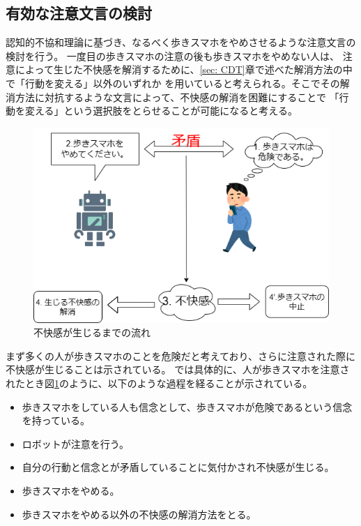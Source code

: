 \documentclass{kuisthesis}
\begin{document}
\subsection{有効な注意文言の検討}
認知的不協和理論に基づき、なるべく歩きスマホをやめさせるような注意文言の検討を行う。
一度目の歩きスマホの注意の後も歩きスマホをやめない人は、
注意によって生じた不快感を解消するために、\ref{sec: CDT}章で述べた解消方法の中で「行動を変える」以外のいずれか
を用いていると考えられる。そこでその解消方法に対抗するような文言によって、不快感の解消を困難にすることで
「行動を変える」という選択肢をとらせることが可能になると考える。
\label{sec: dissonance}
\begin{figure}[htbp]
  
  \includegraphics[width=13cm]{img/CDT.png}
  \caption{不快感が生じるまでの流れ}
  \label{fig: dissonance}
\end{figure}
まず多くの人が歩きスマホのことを危険だと考えており、さらに注意された際に不快感が生じることは示されている。
\cite{Schneider2022}では具体的に、人が歩きスマホを注意されたとき図\ref{fig: dissonance}のように、以下のような過程を経ることが示されている。
\begin{itemize}
  \item[(1)] 歩きスマホをしている人も信念として、歩きスマホが危険であるという信念を持っている。
  \item[(2)] ロボットが注意を行う。
  \item[(3)] 自分の行動と信念とが矛盾していることに気付かされ不快感が生じる。
  \item[(4)] 歩きスマホをやめる。
  \item[(4')]歩きスマホをやめる以外の不快感の解消方法をとる。
  \label{item: dissonance}
\end{itemize}
\end{document}
